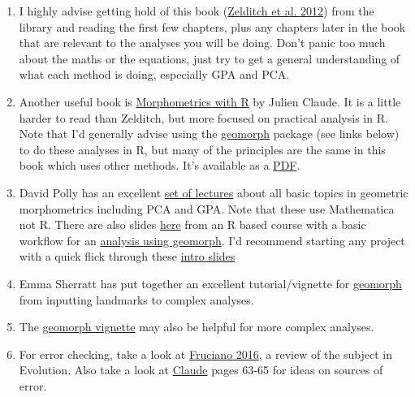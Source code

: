 \documentclass[]{book}
\theoremstyle{definition}
\theoremstyle{definition}
\theoremstyle{definition}
\theoremstyle{remark}
\begin{document}
\begin{enumerate}
\def\labelenumi{\arabic{enumi}.}
\item
  I highly advise getting hold of this book
  (\href{http://store.elsevier.com/Geometric-Morphometrics-for-Biologists/Miriam-Zelditch/isbn-9780123869036/}{Zelditch
  et al. 2012}) from the library and reading the first few chapters,
  plus any chapters later in the book that are relevant to the analyses
  you will be doing. Don't panic too much about the maths or the
  equations, just try to get a general understanding of what each method
  is doing, especially GPA and PCA.
\item
  Another useful book is
  \href{http://lib.du.ac.ir/documents/10157/60743/Morphometrics+With+R.pdf}{Morphometrics
  with R} by Julien Claude. It is a little harder to read than Zelditch,
  but more focused on practical analysis in R. Note that I'd generally
  advise using the
  \href{https://cran.r-project.org/web/packages/geomorph/geomorph.pdf}{geomorph}
  package (see links below) to do these analyses in R, but many of the
  principles are the same in this book which uses other methods. It's
  available as a
  \href{http://lib.du.ac.ir/documents/10157/60743/Morphometrics+With+R.pdf}{PDF}.
\item
  David Polly has an excellent \href{http://www.indiana.edu/~g562/}{set
  of lectures} about all basic topics in geometric morphometrics
  including PCA and GPA. Note that these use Mathematica not R. There
  are also slides \href{http://www.indiana.edu/~g562/PBDB2013/}{here}
  from an R based course with a basic workflow for an
  \href{http://www.indiana.edu/~g562/PBDB2013/Day\%202B\%20-\%20Geometric\%20Morphometrics\%20in\%20R.pdf}{analysis
  using geomorph}. I'd recommend starting any project with a quick flick
  through these
  \href{http://www.indiana.edu/~g562/PBDB2013/Day\%202A\%20-\%20Introduction\%20to\%20Geometric\%20Morphometrics.pdf}{intro
  slides}
\item
  Emma Sherratt has put together an excellent tutorial/vignette for
  \href{http://www.public.iastate.edu/~dcadams/PDFPubs/Quick\%20Guide\%20to\%20Geomorph\%20v2.0.pdf}{geomorph}
  from inputting landmarks to complex analyses.
\item
  The
  \href{https://cran.r-project.org/web/packages/geomorph/geomorph.pdf}{geomorph
  vignette} may also be helpful for more complex analyses.
\item
  For error checking, take a look at
  \href{http://link.springer.com/article/10.1007/s00427-016-0537-4}{Fruciano
  2016}, a review of the subject in Evolution. Also take a look at
  \href{http://lib.du.ac.ir/documents/10157/60743/Morphometrics+With+R.pdf}{Claude}
  pages 63-65 for ideas on sources of error.
\end{enumerate}
\end{document}
